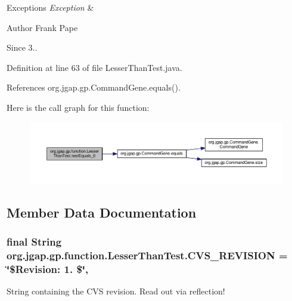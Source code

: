 \begin{DoxyExceptions}{Exceptions}
{\em Exception} & \\
\hline
\end{DoxyExceptions}
\begin{DoxyAuthor}{Author}
Frank Pape 
\end{DoxyAuthor}
\begin{DoxySince}{Since}
3.. 
\end{DoxySince}


Definition at line 63 of file Lesser\-Than\-Test.\-java.



References org.\-jgap.\-gp.\-Command\-Gene.\-equals().



Here is the call graph for this function\-:
\nopagebreak
\begin{figure}[H]
\begin{center}
\leavevmode
\includegraphics[width=350pt]{classorg_1_1jgap_1_1gp_1_1function_1_1_lesser_than_test_a6ce92a58f3fdd48b5e119e6406c09339_cgraph}
\end{center}
\end{figure}




\subsection{Member Data Documentation}
\hypertarget{classorg_1_1jgap_1_1gp_1_1function_1_1_lesser_than_test_aa78007efd71d369041019932f9000131}{
\subsubsection[{C\-V\-S\-\_\-\-R\-E\-V\-I\-S\-I\-O\-N}]{\setlength{\rightskip}{0pt plus 5cm}final String org.\-jgap.\-gp.\-function.\-Lesser\-Than\-Test.\-C\-V\-S\-\_\-\-R\-E\-V\-I\-S\-I\-O\-N = \char`\"{}\$Revision\-: 1. \$\char`\"{}\hspace{0.3cm}{\ttfamily [static]}, {\ttfamily [private]}}}\label{classorg_1_1jgap_1_1gp_1_1function_1_1_lesser_than_test_aa78007efd71d369041019932f9000131}
String containing the C\-V\-S revision. Read out via reflection! 

